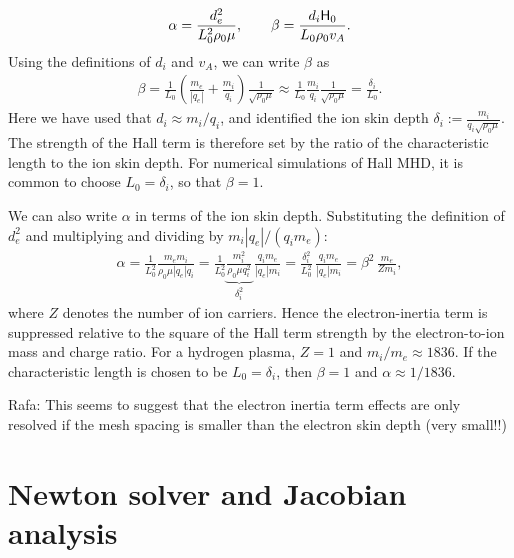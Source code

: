 \documentclass[preprint,1p]{elsarticle}
\newcommand{\rf}[1]{{\leavevmode\color{orange}Rafa: #1}}
\begin{document}
\begin{appendix}
\begin{align*}
    \alpha = \frac{d_e^2}{L_0^2\rho_0\mu}, \qquad \beta = \frac{d_i{\mathsf{H}}_0}{L_0\rho_0 v_A}.
\end{align*}
Using the definitions of $d_i$ and $v_A$, we can write $\beta$ as
\begin{align*}
    \beta = \frac{1}{L_0}\left(\frac{m_e}{|q_e|}+\frac{m_i}{q_i}\right)\frac{1}{\sqrt{\rho_0\mu}}
    \approx\frac{1}{L_0}\frac{m_i}{q_i}\frac{1}{\sqrt{\rho_0\mu}}
    =\frac{\delta_i}{L_0}.
\end{align*}
Here we have used that $d_i\approx m_i/q_i$, and identified the ion skin depth $\delta_i:=\frac{m_i}{q_i\sqrt{\rho_0\mu}}$. The strength of the Hall term is therefore set by the ratio of the characteristic length to the ion skin depth. For numerical simulations of Hall MHD, it is common to choose $L_0=\delta_i$, so that $\beta = 1$.

We can also write $\alpha$ in terms of the ion skin depth. Substituting the definition of $d_e^2$ and multiplying and dividing by $m_i |q_e| / (q_i m_e)$:
\begin{align*}
    \alpha = \frac{1}{L_0^2}\frac{m_em_i}{\rho_0\mu |q_e| q_i}
    = \frac{1}{L_0^2}\underbrace{\frac{m_i^2}{\rho_0\mu q_i^2}}_{\delta_i^2}\,\frac{q_i m_e}{|q_e| m_i}
    = \frac{\delta_i^2}{L_0^2}\,\frac{q_i m_e}{|q_e| m_i}
    = \beta^2\,\frac{m_e}{Z m_i},
\end{align*}
where $Z$ denotes the number of ion carriers. Hence the electron-inertia term is suppressed relative to the square of the Hall term strength by the electron-to-ion mass and charge ratio. For a hydrogen plasma, $Z=1$ and $m_i/m_e \approx 1836$. If the characteristic length is chosen to be $L_0=\delta_i$, then $\beta = 1$ and $\alpha \approx 1/1836$.

\rf{This seems to suggest that the electron inertia term effects are only resolved if the mesh spacing is smaller than the electron skin depth (very small!!)}



\section{Newton solver and Jacobian analysis}





\end{appendix}


\newpage


\end{document}
